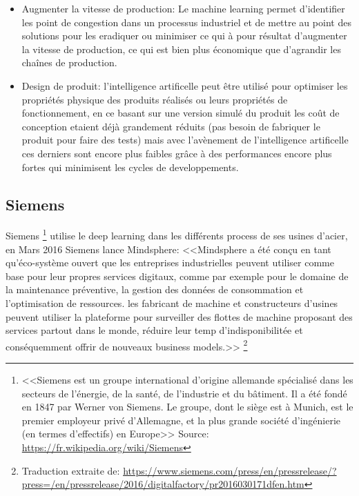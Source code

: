 \begin{itemize}
    \item Augmenter la vitesse de production: Le machine learning permet d'identifier les point 
    de congestion dans un processus industriel et de mettre au point des solutions pour les eradiquer 
    ou minimiser ce qui à pour résultat d'augmenter la vitesse de production, ce qui est bien 
    plus économique que d'agrandir les chaînes de production. \newline 

    \item Design de produit: l'intelligence artificelle peut être utilisé pour optimiser les propriétés 
    physique des produits réalisés ou leurs propriétés de fonctionnement, en ce basant sur une
    version simulé du produit les coût de conception etaient déjà grandement réduits 
    (pas besoin de fabriquer le produit pour faire des tests) mais avec l'avènement de 
    l'intelligence artificelle ces derniers sont encore plus faibles grâce à des performances
    encore plus fortes qui minimisent les cycles de developpements.
    \newline
\end{itemize}

\subsection{Siemens}
Siemens \footnote{<<Siemens est un groupe 
international d’origine allemande spécialisé dans les secteurs de l'énergie, 
de la santé, de l'industrie et du bâtiment. 
Il a été fondé en 1847 par Werner von Siemens. 
Le groupe, dont le siège est à Munich, est le premier employeur privé d'Allemagne, 
et la plus grande société d'ingénierie (en termes d'effectifs) en Europe>> 
Source: \url{https://fr.wikipedia.org/wiki/Siemens}}
utilise le deep learning dans les différents process de ses usines d'acier,
en Mars 2016 Siemens lance Mindsphere: 
<<Mindsphere a été conçu en tant qu'éco-système ouvert que les entreprises industrielles
peuvent utiliser comme base pour leur propres services digitaux, comme par exemple pour 
le domaine de la maintenance préventive, la gestion des données de consommation et 
l'optimisation de ressources. les fabricant de machine et constructeurs d'usines
peuvent utiliser la plateforme pour surveiller des flottes de machine proposant des
services partout dans le monde, réduire leur temp d'indisponibilitée et 
conséquemment offrir de nouveaux business models.>> 
\footnote{Traduction extraite de: \url{https://www.siemens.com/press/en/pressrelease/?press=/en/pressrelease/2016/digitalfactory/pr2016030171dfen.htm}}
\newline

